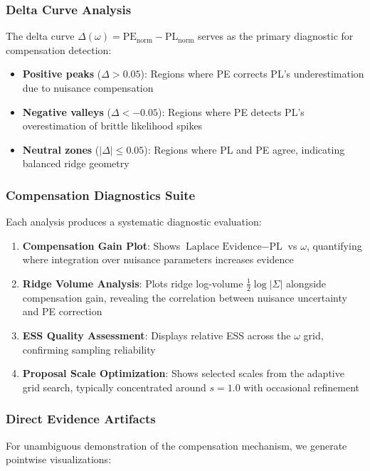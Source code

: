 \documentclass[conference]{IEEEtran}
\begin{document}
\subsubsection{Delta Curve Analysis}
The delta curve $\Delta(\omega) = \text{PE}_{\text{norm}} - \text{PL}_{\text{norm}}$ serves as the primary diagnostic for compensation detection:
\begin{itemize}
\item \textbf{Positive peaks} ($\Delta > 0.05$): Regions where PE corrects PL's underestimation due to nuisance compensation
\item \textbf{Negative valleys} ($\Delta < -0.05$): Regions where PE detects PL's overestimation of brittle likelihood spikes
\item \textbf{Neutral zones} ($|\Delta| \leq 0.05$): Regions where PL and PE agree, indicating balanced ridge geometry
\end{itemize}

\subsubsection{Compensation Diagnostics Suite}
Each analysis produces a systematic diagnostic evaluation:
\begin{enumerate}
\item \textbf{Compensation Gain Plot}: Shows $\text{Laplace Evidence} - \text{PL}$ vs $\omega$, quantifying where integration over nuisance parameters increases evidence
\item \textbf{Ridge Volume Analysis}: Plots ridge log-volume $\frac{1}{2}\log|\Sigma|$ alongside compensation gain, revealing the correlation between nuisance uncertainty and PE correction
\item \textbf{ESS Quality Assessment}: Displays relative ESS across the $\omega$ grid, confirming sampling reliability
\item \textbf{Proposal Scale Optimization}: Shows selected scales from the adaptive grid search, typically concentrated around $s=1.0$ with occasional refinement
\end{enumerate}

\subsubsection{Direct Evidence Artifacts}
For unambiguous demonstration of the compensation mechanism, we generate pointwise visualizations:
\end{document}
